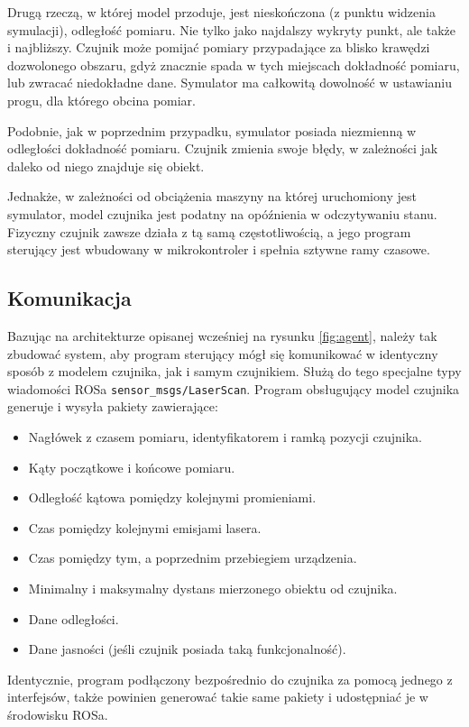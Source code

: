 		Drugą rzeczą, w której model przoduje, jest nieskończona (z punktu widzenia symulacji), odległość pomiaru.
		Nie tylko jako najdalszy wykryty punkt, ale także i najbliższy. 
		Czujnik może pomijać pomiary przypadające za blisko krawędzi dozwolonego obszaru, gdyż znacznie spada w tych miejscach dokładność pomiaru, lub zwracać niedokładne dane.
		Symulator ma całkowitą dowolność w ustawianiu progu, dla którego obcina pomiar.

		Podobnie, jak w poprzednim przypadku, symulator posiada niezmienną w odległości dokładność pomiaru.
		Czujnik zmienia swoje błędy, w zależności jak daleko od niego znajduje się obiekt.

		Jednakże, w zależności od obciążenia maszyny na której uruchomiony jest symulator, model czujnika jest podatny na opóźnienia w odczytywaniu stanu.
		Fizyczny czujnik zawsze działa z tą samą częstotliwością, a jego program sterujący jest wbudowany w mikrokontroler i spełnia sztywne ramy czasowe.

	\subsection{Komunikacja}
		Bazując na architekturze opisanej wcześniej na rysunku \ref{fig:agent}, należy tak zbudować system, aby program sterujący mógł się komunikować w identyczny sposób z 
		modelem czujnika, jak i samym czujnikiem.
		Służą do tego specjalne typy wiadomości ROSa \texttt{sensor\_msgs/LaserScan}.
		Program obsługujący model czujnika generuje i wysyła pakiety zawierające:
		\begin{itemize}
			\item Nagłówek z czasem pomiaru, identyfikatorem i ramką pozycji czujnika.
			\item Kąty początkowe i końcowe pomiaru.
			\item Odległość kątowa pomiędzy kolejnymi promieniami.
			\item Czas pomiędzy kolejnymi emisjami lasera.
			\item Czas pomiędzy tym, a poprzednim przebiegiem urządzenia.
			\item Minimalny i maksymalny dystans mierzonego obiektu od czujnika.
			\item Dane odległości.
			\item Dane jasności (jeśli czujnik posiada taką funkcjonalność).
		\end{itemize}

		Identycznie, program podłączony bezpośrednio do czujnika za pomocą jednego z interfejsów, także powinien generować takie same pakiety i udostępniać je w środowisku ROSa.

